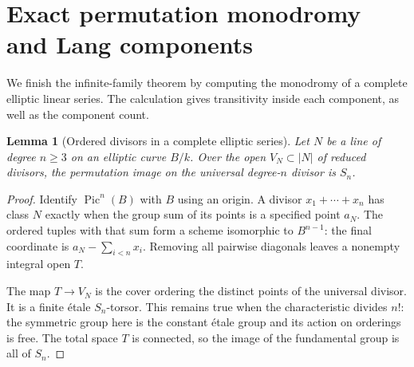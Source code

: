 \documentclass[11pt]{article}
\newtheorem{lemma}[theorem]{Lemma}
\theoremstyle{remark}\newtheorem{remark}[theorem]{Remark}
\newcommand{\Pic}{\operatorname{Pic}}
\begin{document}
\section{Exact permutation monodromy and Lang components}\label{sec:odd-proof}

We finish the infinite-family theorem by computing the monodromy of a complete elliptic linear series. The calculation gives transitivity inside each component, as well as the component count.

\begin{lemma}[Ordered divisors in a complete elliptic series]\label{lem:ordered}
Let $N$ be a line of degree $n\ge3$ on an elliptic curve $B/k$. Over the open $V_N\subset|N|$ of reduced divisors, the permutation image on the universal degree-$n$ divisor is $S_n$.
\end{lemma}
\begin{proof}
Identify $\Pic^n(B)$ with $B$ using an origin. A divisor $x_1+\cdots+x_n$ has class $N$ exactly when the group sum of its points is a specified point $a_N$. The ordered tuples with that sum form a scheme isomorphic to $B^{n-1}$: the final coordinate is $a_N-\sum_{i<n}x_i$. Removing all pairwise diagonals leaves a nonempty integral open $T$.

The map $T\to V_N$ is the cover ordering the distinct points of the universal divisor. It is a finite \'etale $S_n$-torsor. This remains true when the characteristic divides $n!$: the symmetric group here is the constant \'etale group and its action on orderings is free. The total space $T$ is connected, so the image of the fundamental group is all of $S_n$.
\end{proof}
\end{document}

